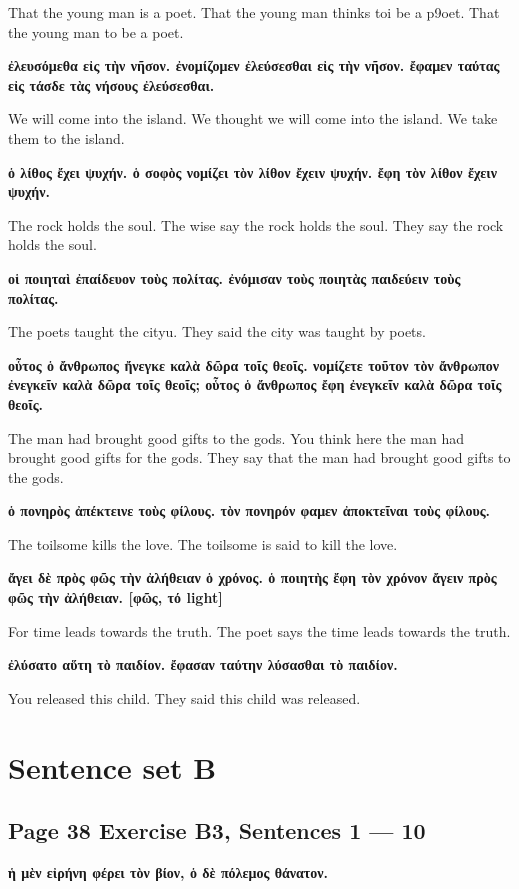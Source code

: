 That the young man is a poet. That the young man thinks toi be a p9oet. That the young man to be a poet.

\noindent\textbf{ἐλευσόμεθα εἰς τὴν νῆσον. ἐνομίζομεν ἐλεύσεσθαι εἰς τὴν νῆσον. ἔφαμεν ταύτας εἰς τάσδε τὰς νήσους ἐλεύσεσθαι.}

We will come into the island. We thought we will come into the island. We take them to the island.

\noindent\textbf{ὁ λίθος ἔχει ψυχήν. ὁ σοφὸς νομίζει τὸν λίθον ἔχειν ψυχήν. ἔφη τὸν λίθον ἔχειν ψυχήν.}

The rock holds the soul. The wise say the rock holds the soul. They say the rock holds the soul.

\noindent\textbf{οἱ ποιηταὶ ἐπαίδευον τοὺς πολίτας. ἐνόμισαν τοὺς ποιητὰς παιδεύειν τοὺς πολίτας.}

The poets taught the cityu. They said the city was taught by poets.

\noindent\textbf{οὗτος ὁ ἄνθρωπος ἤνεγκε καλὰ δῶρα τοῖς θεοῖς. νομίζετε τοῦτον τὸν ἄνθρωπον ἐνεγκεῖν καλὰ δῶρα τοῖς θεοῖς; οὗτος ὁ ἄνθρωπος ἔφη ἐνεγκεῖν καλὰ δῶρα τοῖς θεοῖς.}

The man had brought good gifts to the gods. You think here the man had brought good gifts for the gods. They say that the man had brought good gifts to the gods.

\noindent\textbf{ὁ πονηρὸς ἀπέκτεινε τοὺς φίλους. τὸν πονηρόν φαμεν ἀποκτεῖναι τοὺς φίλους.}

The toilsome kills the love. The toilsome is said to kill the love.

\noindent\textbf{ἄγει δὲ πρὸς φῶς τὴν ἀλήθειαν ὁ χρόνος. ὁ ποιητὴς ἔφη τὸν χρόνον ἄγειν πρὸς φῶς τὴν ἀλήθειαν. [φῶς, τό light]}

For time leads towards the truth. The poet says the time leads towards the truth.

\noindent\textbf{ἐλύσατο αὕτη τὸ παιδίον. ἔφασαν ταύτην λύσασθαι τὸ παιδίον.}

You released this child. They said this child was released.

\section*{Sentence set B}
\subsection*{Page 38 Exercise B3, Sentences 1 --- 10}
\noindent\textbf{ἡ μὲν εἰρήνη φέρει τὸν βίον, ὁ δὲ πόλεμος θάνατον.}

